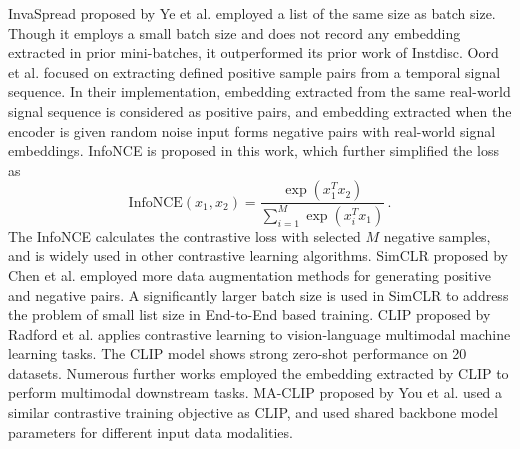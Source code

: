 \documentclass[12pt,twoside]{report}
\begin{document}
InvaSpread proposed by Ye et al.\cite{invaspread} employed a list of the same size as batch size. Though it employs a small batch size and does not record any embedding extracted in prior mini-batches, it outperformed its prior work of Instdisc. Oord et al.\cite{cpc} focused on extracting defined positive sample pairs from a temporal signal sequence. In their implementation, embedding extracted from the same real-world signal sequence is considered as positive pairs, and embedding extracted when the encoder is given random noise input forms negative pairs with real-world signal embeddings. InfoNCE is proposed in this work, which further simplified the loss as $$\text{InfoNCE}(x_1, x_2) = \frac{\exp(x_1^T x_2)}{\sum_{i = 1}^{M} \exp(x_i^T x_1)}\,.$$The InfoNCE calculates the contrastive loss with selected $M$ negative samples, and is widely used in other contrastive learning algorithms. SimCLR proposed by Chen et al.\cite{simclr} employed more data augmentation methods for generating positive and negative pairs. A significantly larger batch size is used in SimCLR to address the problem of small list size in End-to-End based training. CLIP proposed by Radford et al.\cite{clip} applies contrastive learning to vision-language multimodal machine learning tasks. The CLIP model shows strong zero-shot performance on 20 datasets. Numerous further works employed the embedding extracted by CLIP to perform multimodal downstream tasks. MA-CLIP proposed by You et al.\cite{maclip} used a similar contrastive training objective as CLIP, and used shared backbone model parameters for different input data modalities. \\
\end{document}

